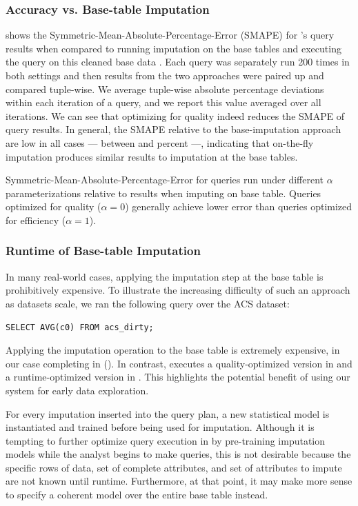 \subsubsection{Accuracy vs. Base-table Imputation}

 shows the Symmetric-Mean-Absolute-Percentage-Error (SMAPE) for
\ProjectName{}'s query results when compared to running imputation on the base tables and
executing the query on this cleaned base data \cite{tofallis2015better}.  Each query was
separately run 200 times in both settings and then results from the two approaches were
paired up and compared tuple-wise.  We average tuple-wise absolute percentage deviations
within each iteration of a query, and we report this value averaged over all iterations.  We
can see that optimizing for quality indeed reduces the SMAPE of query results.  In general,
the SMAPE relative to the base-imputation approach are low in all cases --- between
\lowsmapealphazero{} and \highsmapealphaoneexacs{} percent ---, indicating that on-the-fly
imputation produces similar results to imputation at the base tables.

\begin{table}
\centering

\caption{Symmetric-Mean-Absolute-Percentage-Error for queries run under different $\alpha$
    parameterizations relative to results when imputing on base table. Queries optimized for quality ($\alpha=0$) generally achieve
    lower error than queries optimized for efficiency ($\alpha=1$).}
\label{table:smape}
\end{table}

\subsubsection{Runtime of Base-table Imputation}
In many real-world cases, applying the imputation step at the base table is prohibitively
expensive.
To illustrate the increasing difficulty of such an approach as datasets scale, we ran the following query over the ACS dataset:
\begin{lstlisting}[breaklines]
SELECT AVG(c0) FROM acs_dirty;
\end{lstlisting}
Applying the imputation operation to the base table is extremely expensive, in our case
completing in \acsbaseresultminutes{} (). In contrast, \ProjectName{} executes a quality-optimized version
in \acsimputedbzeroresult{} and a runtime-optimized version in \acsimputedboneresult{}. This highlights the potential
benefit of using our system for early data exploration.

For every imputation inserted into the query plan, a new statistical model is instantiated and trained before being used for imputation.
Although it is tempting to further optimize query execution in \ProjectName{} by pre-training imputation models while the analyst begins to make queries,
this is not desirable because the specific rows of data, set of complete attributes, and set of attributes to impute are not known until runtime.
Furthermore, at that point, it may make more sense to specify a coherent model over the entire base table instead. 

